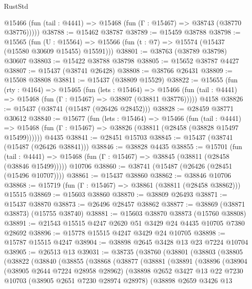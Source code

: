 \begin{lexlean}{RustStd}
\begin{coremodule}
      @15466 (fun (tail : @4441) => @15468 (fun (Γ : @15467) => @38743 (@38770 @38776)))))
@38788 := @15462 @38787
@38789 := @15459 @38788
@38798 := @15565
    (fun (U : @15564) => @15566 (fun (t : @7) => @15574 (@15437 (@15580 @30609 @15455) @15591)))
@38801 := @38763 (@38789 @38798) @30607
@38803 := @15422 @38788 @38798
@38805 := @15652 @38787 @4427
@38807 := @15437 (@38741 @26428)
@38808 := @38766 @26431
@38809 := @15508 @38808
@38811 := @15437 (@38809 @15529)
@38822 := @15655
    (fun (rty : @4164) =>
    @15465
      (fun (lets : @15464) =>
      @15466 (fun (tail : @4441) => @15468 (fun (Γ : @15467) => @38807 (@38811 @38776)))))
    @4158
@38826 := @15437 (@38741 (@15487 (@26426 @28452)))
@38828 := @28459 @38771 @30612
@38840 := @15677
    (fun (lets : @15464) =>
    @15466
      (fun (tail : @4441) =>
      @15468 (fun (Γ : @15467) => @38826 (@38811 (@28458 (@38828 @15497 @15499))))))
    @4435
@38841 := @28451 @15703
@38845 := @15437 (@38741 (@15487 (@26426 @38841)))
@38846 := @38828 @4435
@38855 := @15701
    (fun (tail : @4441) => @15468 (fun (Γ : @15467) => @38845 (@38811 (@28458 (@38846 @15499)))))
    @10706
@38860 := @38741 (@15487 (@26426 (@28451 (@15496 @10707))))
@38861 := @15437 @38860
@38862 := @38846 @10706
@38868 := @15719 (fun (Γ : @15467) => @38861 (@38811 (@28458 @38862))) @15515
@38869 := @15603 @38860
@38870 := @38809 @26493
@38871 := @15437 @38870
@38873 := @26496 @28457 @38862
@38877 := @38869 (@38871 @38873) (@15755 @38740)
@38881 := @15603 @38870 @38873 (@15760 @38808)
@38891 := @21543 @15515 @4247 @2620 @51 @3429 @24 @4435 @10705 @7380 @28692
@38896 := @15778 @15515 @4247 @3429 @24 @10705
@38898 := @15787 @15515 @4247
@38904 := @38898 @2645 @3428 @13 @23 @7224 @10704
@38905 := @26513 @13
@39031 := @38735
    (@38760
      (@38801
        (@38803
          (@38805
            (@38822
              (@38840
                (@38855
                  (@38868
                    (@38877
                      (@38881
                        (@38891
                          (@38896
                            (@38904
                              (@38905 @2644 @7224 @28958 @28962)
                              (@38898
                                @2652
                                @3427
                                @13
                                @22
                                @7230
                                @10703
                                (@38905 @2651 @7230 @28974 @28978)
                                (@38898
                                  @2659
                                  @3426
                                  @13

\end{coremodule}
\end{lexlean}
